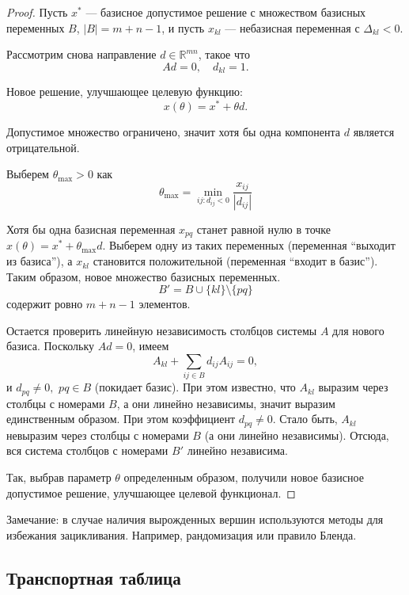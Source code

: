 \documentclass[12pt]{article}
\theoremstyle{definition}
\theoremstyle{plain}
\theoremstyle{definition}
\begin{document}
\begin{proof}
Пусть $x^*$ --- базисное допустимое решение с множеством базисных переменных $B$, 
$|B| = m+n-1$, и пусть $x_{kl}$ --- небазисная переменная с $\Delta_{kl} < 0$. 

Рассмотрим снова направление $d \in \mathbb{R}^{mn}$, такое что
\[
A d = 0, \quad d_{kl} = 1.
\]

Новое решение, улучшающее целевую функцию:
\[
x(\theta) = x^* + \theta d.
\]

Допустимое множество ограничено, значит хотя бы одна компонента $d$ является отрицательной.

Выберем $\theta_{\max} > 0$ как
\begin{equation}\label{eq:theta}
\theta_{\max} = \min_{ij: d_{ij} < 0}{\frac{x_{ij}}{|d_{ij}|}}
\end{equation}

Хотя бы одна базисная переменная $x_{pq}$ станет равной нулю в точке
$x(\theta) = x^* + \theta_{\max}d$. Выберем одну из таких переменных
(переменная ``выходит из базиса''), а $x_{kl}$ становится
положительной (переменная ``входит в базис''). 
Таким образом, новое множество базисных переменных.
\[
B' = B \cup \{kl\} \setminus \{pq\}
\]
содержит ровно $m+n-1$ элементов.

Остается проверить линейную независимость столбцов системы $A$ для нового базиса. 
Поскольку $A d = 0$, имеем
\[
A_{kl} + \sum_{ij \in B} d_{ij} A_{ij} = 0,
\]
и $d_{pq} \neq 0,$ $pq \in B$ (покидает базис). При этом известно, что $A_{kl}$
выразим через столбцы с номерами $B$, а они линейно независимы, значит выразим единственным образом.
При этом коэффициент $d_{pq} \neq 0$. Стало быть, $A_{kl}$ невыразим через столбцы с
номерами $B$ (а они линейно независимы). Отсюда, вся система столбцов с номерами $B'$ линейно независима.

Так, выбрав параметр $\theta$ определенным образом, получили новое базисное допустимое решение,
улучшающее целевой функционал.
\end{proof}

Замечание: в случае наличия вырожденных вершин используются
методы для избежания зацикливания. Например, рандомизация или правило Бленда\cite{conf5}.










\subsection{Транспортная таблица}
\end{document}

